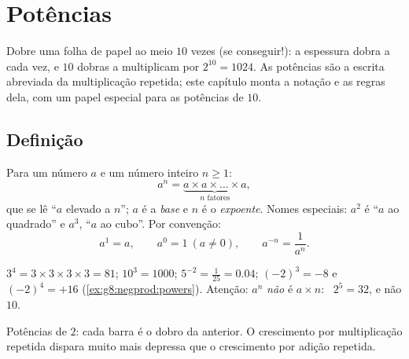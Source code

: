 \chapter{Potências}\label{ch:g8:powers}

Dobre uma folha de papel ao meio $10$ vezes (se conseguir!): a espessura
dobra a cada vez, e $10$ dobras a multiplicam por $2^{10} = 1024$. As
potências são a escrita abreviada da multiplicação repetida; este
capítulo monta a notação e as regras dela, com um papel especial para
as potências de $10$.

\section{Definição}

\begin{definition}[Potência]\label{def:g8:powers:def}
Para um número $a$ e um número inteiro $n \geq 1$:
\[
a^n = \underbrace{a \times a \times \dots \times a}_{n
\text{ fatores}},
\]
que se lê ``$a$ elevado a $n$''; $a$ é a \emph{base} e $n$ é o
\emph{expoente}. Nomes especiais: $a^2$ é ``$a$ ao
quadrado'' e $a^3$, ``$a$ ao cubo''. Por convenção:
\[
a^1 = a,
\qquad
a^0 = 1 \ (a \neq 0),
\qquad
a^{-n} = \frac{1}{a^n}.
\]
\end{definition}

\begin{example}\label{ex:g8:powers:def}
$3^4 = 3 \times 3 \times 3 \times 3 = 81$; \quad
$10^3 = 1000$; \quad $5^{-2} = \frac{1}{25} = 0.04$; \quad
$(-2)^3 = -8$ e $(-2)^4 = +16$
(\cref{ex:g8:negprod:powers}). Atenção: $a^n$ \emph{não} é
$a \times n$: \ $2^5 = 32$, e não $10$.
\end{example}

\begin{omfigure}

{\small Potências de $2$: cada barra é o dobro da anterior. O
crescimento por multiplicação repetida dispara muito mais depressa que
o crescimento por adição repetida.}
\end{omfigure}

